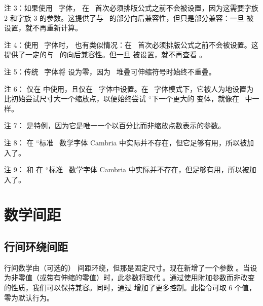 注 3：如果使用 \TFM\ 字体， 在 \LUATEX\ 首次必须排版公式之前不会被设置，因为这需要字族 2 和字族 3 的参数。这提供了与 \ 的部分向后兼容性，但只是部分兼容：一旦  被设置，就不再重新计算。

注 4：使用 \TFM\ 字体时， 也有类似情况：在 \LUATEX\ 首次必须排版公式之前不会被设置。这提供了一定的与 \ 的向后兼容性。但一旦  被设置，就不再查看 。

注 5：传统 \TFM\ 字体将  设为零，因为 \ 堆叠可伸缩符号时始终不重叠。

注 6： 仅在  中使用，且仅在 \OPENTYPE\ 字体中设置。在 \TFM\ 字体模式下，它被人为地设置为比初始尝试尺寸大一个缩放点，以便始终尝试 ``下一个更大的 变体，就像在 \ 中一样。

注 7： 是特例，因为它是唯一一个以百分比而非缩放点数表示的参数。

注 8： 在 ``标准 \OPENTYPE\ 数学字体 Cambria 中实际并不存在，但它足够有用，所以被加入了。

注 9： 和  在 ``标准 \OPENTYPE\ 数学字体 Cambria 中实际并不存在，但足够有用，所以被加入了。

\section{数学间距}

\subsection{行间环绕间距}


行间数学由（可选的） 间距环绕，但那是固定尺寸。现在新增了一个参数 。当设为非零值（或带有伸缩的零值）时，此参数将取代 。通过使用附加参数而非改变  的性质，我们可以保持兼容。同时，通过  增加了更多控制。此指令可取 6 个值，零为默认行为。


